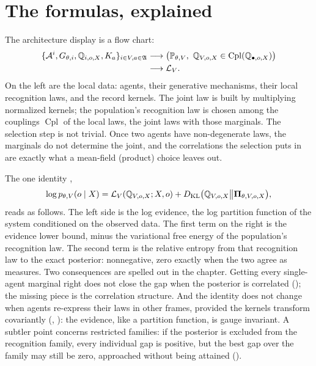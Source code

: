 \section{The formulas, explained}
\label{comp:ch01-formulas}

The architecture display  is a flow chart:
\[
\begin{aligned}
\{\mathcal A^i,G_{\theta,i},\mathbb Q_{i,o,X},K_a\}_{i\in V,a\in\mathfrak A}
&\longrightarrow
\bigl(\mathbb P_{\theta,V},\ \mathbb Q_{V,o,X}\in\operatorname{Cpl}(\mathbb Q_{\bullet,o,X})\bigr)\\
&\longrightarrow\mathcal L_V .
\end{aligned}
\]
On the left are the local data: agents, their generative mechanisms, their local recognition laws,
and the record kernels. The joint law is built by multiplying normalized kernels; the population's
recognition law is chosen among the couplings $\operatorname{Cpl}$ of the local laws, the joint laws
with those marginals. The selection step is not trivial. Once two agents have non-degenerate laws, the
marginals do not determine the joint, and the correlations the selection puts in are exactly what a
mean-field (product) choice leaves out.

The one identity ,
\[
\log p_{\theta,V}(o\mid X)=\mathcal L_V(\mathbb Q_{V,o,X};X,o)+D_{\mathrm{KL}}\bigl(\mathbb Q_{V,o,X}\big\Vert\boldsymbol\Pi_{\theta,V,o,X}\bigr),
\]
reads as follows. The left side is the log evidence, the log partition function of the system
conditioned on the observed data. The first term on the right is the evidence lower bound, minus the
variational free energy of the population's recognition law. The second term is the relative entropy
from that recognition law to the exact posterior: nonnegative, zero exactly when the two agree as
measures. Two consequences are spelled out in the chapter. Getting every single-agent marginal right
does not close the gap when the posterior is correlated (); the missing
piece is the correlation structure. And the identity does not change when agents re-express their
laws in other frames, provided the kernels transform covariantly
(, ): the evidence,
like a partition function, is gauge invariant. A subtler point concerns restricted families: if the
posterior is excluded from the recognition family, every individual gap is positive, but the best gap
over the family may still be zero, approached without being attained ().

